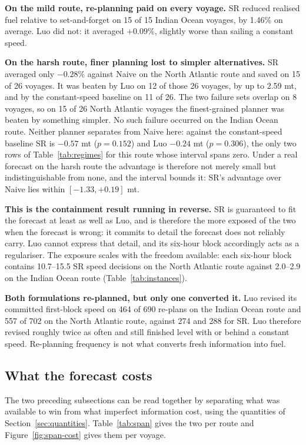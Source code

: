 \documentclass[review,authoryear]{elsarticle}
\begin{document}
\noindent\textbf{On the mild route, re-planning paid on every voyage.} SR reduced
realised fuel relative to set-and-forget on 15 of 15 Indian Ocean voyages, by 1.46\% on average.
Luo did not: it averaged $+0.09\%$, slightly worse than sailing a constant speed.

\noindent\textbf{On the harsh route, finer planning lost to simpler alternatives.} SR
averaged only $-0.28\%$ against Naive on the North Atlantic route and saved on 15 of 26 voyages. It
was beaten by Luo on 12 of those 26 voyages, by up to 2.59 mt, and by the
constant-speed baseline on 11 of 26. The two failure sets overlap on 8 voyages, so on 15 of 26 North
Atlantic voyages the finest-grained planner was beaten by something simpler. No such failure occurred
on the Indian Ocean route. Neither planner separates from Naive here: against the constant-speed
baseline SR is $-0.57$ mt ($p=0.152$) and Luo $-0.24$ mt ($p=0.306$), the only two rows of Table~\ref{tab:regimes}
for this route whose interval spans zero. Under a real forecast on the harsh route the advantage is
therefore not merely small but indistinguishable from none, and the interval bounds it: SR's advantage
over Naive lies within $[-1.33, +0.19]$ mt.

\noindent\textbf{This is the containment result running in reverse.} SR is guaranteed to fit the
forecast at least as well as Luo, and is therefore the more exposed of the two when the forecast is
wrong: it commits to detail the forecast does not reliably carry. Luo cannot express that detail, and
its six-hour block accordingly acts as a regulariser. The exposure scales with the freedom available:
each six-hour block contains 10.7--15.5 SR speed decisions on the North Atlantic route against
2.0--2.9 on the Indian Ocean route (Table~\ref{tab:instances}).

\noindent\textbf{Both formulations re-planned, but only one converted it.} Luo
revised its committed first-block speed on 464 of 690 re-plans on the Indian Ocean route and 557 of
702 on the North Atlantic route, against 274 and 288 for SR. Luo therefore revised
roughly twice as often and still finished level with or behind a constant speed. Re-planning
frequency is not what converts fresh information into fuel.

\subsection{What the forecast costs}
\label{sec:res-span}
The two preceding subsections can be read together by separating what was available to win from what
imperfect information cost, using the quantities of Section~\ref{sec:quantities}. Table~\ref{tab:span}
gives the two per route and Figure~\ref{fig:span-cost} gives them per voyage.
\end{document}
